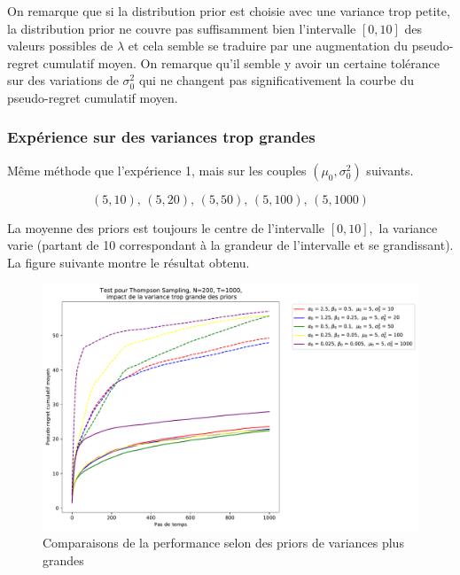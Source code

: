 \documentclass[letterpaper,11pt]{article}
\begin{document}
On remarque que si la distribution prior est choisie avec une variance trop petite, la distribution prior ne couvre pas suffisamment bien l'intervalle $[0,10]$ des valeurs possibles de $\lambda$ et cela semble se traduire par une augmentation du pseudo-regret cumulatif moyen. On remarque qu'il semble y avoir un certaine tolérance sur des variations de $\sigma^2_0$ qui ne changent pas significativement la courbe du pseudo-regret cumulatif moyen.

\subsubsection*{Expérience sur des variances trop grandes}

Même méthode que l'expérience 1, mais sur les couples $(\mu_0,\sigma^2_0)$ suivants.

$$(5,10),\,(5,20),\,(5,50),\,(5,100),\,(5,1000)$$

La moyenne des priors est toujours le centre de l'intervalle $[0,10],$ la variance varie (partant de 10 correspondant à la grandeur de l'intervalle et se grandissant).\\

La figure suivante montre le résultat obtenu.

\begin{figure}[H]
\label{figure: variance petite}
\caption{Comparaisons de la performance selon des priors de variances plus grandes}
\begin{center}
\includegraphics[scale=0.5]{variance_trop_grande_N=200.pdf}
\end{center}
\end{figure}
\end{document}
